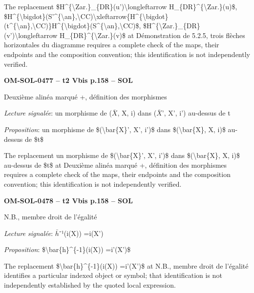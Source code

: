 The replacement \$H\textasciicircum{}\{\textbackslash{}Zar.\}\_\{DR\}(u')\textbackslash{}longleftarrow H\_\{DR\}\textasciicircum{}\{\textbackslash{}Zar.\}(u)\$, \$H\textasciicircum{}\{\textbackslash{}bigdot\}(S'\textasciicircum{}\{\textbackslash{}an\},\textbackslash{}CC)\textbackslash{}xleftarrow\{H\textasciicircum{}\{\textbackslash{}bigdot\}(t\textasciicircum{}\{\textbackslash{}an\},\textbackslash{}CC)\}H\textasciicircum{}\{\textbackslash{}bigdot\}(S\textasciicircum{}\{\textbackslash{}an\},\textbackslash{}CC)\$, \$H\textasciicircum{}\{\textbackslash{}Zar.\}\_\{DR\}(v')\textbackslash{}longleftarrow H\_\{DR\}\textasciicircum{}\{\textbackslash{}Zar.\}(v)\$ at Démonstration de 5.2.5, trois flèches horizontales du diagramme requires a complete check of the maps, their endpoints and the composition convention; this identification is not independently verified.\par
\par\noindent\textbf{OM-SOL-0477 -- t2 Vbis p.158 -- SOL}\par
Deuxième alinéa marqué +, définition des morphismes\par
\emph{Lecture signalée}: un morphisme de (\ensuremath{\bar{X}}, X, i) dans (\ensuremath{\bar{X}}', X', i') au-dessus de t\par
\emph{Proposition}: un morphisme de \$(\textbackslash{}bar\{X\}', X', i')\$ dans \$(\textbackslash{}bar\{X\}, X, i)\$ au-dessus de \$t\$\par
The replacement un morphisme de \$(\textbackslash{}bar\{X\}', X', i')\$ dans \$(\textbackslash{}bar\{X\}, X, i)\$ au-dessus de \$t\$ at Deuxième alinéa marqué +, définition des morphismes requires a complete check of the maps, their endpoints and the composition convention; this identification is not independently verified.\par
\par\noindent\textbf{OM-SOL-0478 -- t2 Vbis p.158 -- SOL}\par
N.B., membre droit de l'égalité\par
\emph{Lecture signalée}: \ensuremath{\bar{h}}⁻¹(i(X)) =\allowbreak  i(X')\par
\emph{Proposition}: \$\textbackslash{}bar\{h\}\textasciicircum{}\{-1\}(i(X)) =\allowbreak  i'(X')\$\par
The replacement \$\textbackslash{}bar\{h\}\textasciicircum{}\{-1\}(i(X)) =\allowbreak  i'(X')\$ at N.B., membre droit de l'égalité identifies a particular indexed object or symbol; that identification is not independently established by the quoted local expression.\par
